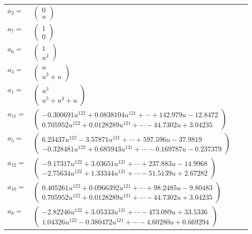 \documentclass[1p]{elsarticle_modified}
\theoremstyle{definition}
\begin{document}
\begin{tabular}{m{7pt} m{180pt} m{7pt} m{180pt} }
\flushright $a_{2}=$&$\begin{pmatrix}0\\u\end{pmatrix}$ \\
\flushright $a_{7}=$&$\begin{pmatrix}1\\0\end{pmatrix}$ \\
\flushright $a_{6}=$&$\begin{pmatrix}1\\u^2\end{pmatrix}$ \\
\flushright $a_{3}=$&$\begin{pmatrix}u\\u^3+u\end{pmatrix}$ \\
\flushright $a_{1}=$&$\begin{pmatrix}u^3\\u^5+u^3+u\end{pmatrix}$ \\
\flushright $a_{11}=$&$\begin{pmatrix}-0.300691 u^{122}+0.0838104 u^{121}+\cdots+142.979 u-12.8472\\0.705952 u^{122}+0.0128289 u^{121}+\cdots-44.7302 u+3.04235\end{pmatrix}$ \\
\flushright $a_{5}=$&$\begin{pmatrix}6.23437 u^{122}-3.57871 u^{121}+\cdots+597.596 u-37.9819\\-0.328481 u^{122}+0.685943 u^{121}+\cdots-0.169787 u-0.237379\end{pmatrix}$ \\
\flushright $a_{12}=$&$\begin{pmatrix}-9.17317 u^{122}+3.03651 u^{121}+\cdots+237.883 u-14.9968\\-2.75634 u^{122}+1.33344 u^{121}+\cdots-51.5139 u+2.67282\end{pmatrix}$ \\
\flushright $a_{10}=$&$\begin{pmatrix}0.405261 u^{122}+0.0966392 u^{121}+\cdots+98.2485 u-9.80483\\0.705952 u^{122}+0.0128289 u^{121}+\cdots-44.7302 u+3.04235\end{pmatrix}$ \\
\flushright $a_{8}=$&$\begin{pmatrix}-2.82246 u^{122}+3.05333 u^{121}+\cdots-473.089 u+33.5336\\1.04326 u^{122}-0.380472 u^{121}+\cdots-4.60280 u+0.669294\end{pmatrix}$ \\

\end{tabular}
\end{document}
